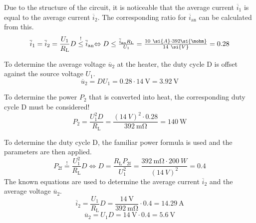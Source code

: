 \begin{solutionblock}

    Due to the structure of the circuit, it is noticeable that the average current $\overline i_1$ is equal to the average current $\overline i_2$. The corresponding ratio for $\overline i_{\mathrm{an}}$ can be calculated from this.
\begin{equation}
\overline i_1 = \overline i_2 = \frac{U_1}{ R_{\mathrm{L}}}  D \overset ! \leq {\overline i_{\mathrm{an}}}$$
 $$\Leftrightarrow D \leq \frac{ {\overline i_{\mathrm{an}}}  R_{\mathrm{L}}}{U_1} = \frac{10 \ \si{A} \cdot 392 \si{\mohm}}{14\ \si{V}} = 0.28
\end{equation}

To determine the average voltage $\overline u_2$ at the heater, the duty cycle D is offset against the source voltage $U_1$.
 \begin{equation}
 \overline u_2 = D  U_1 = 0.28 \cdot \SI{14}{\volt} = \SI{3.92}{\volt}
\end{equation}

To determine the power $P_2$ that is converted into heat, the corresponding duty cycle D must be considered!
 \begin{equation}
 P_2 = \frac{U_1^2 D}{ R_{\mathrm{L}}} = \frac{(14\ \si{V})^2 \cdot 0.28}{392\ \si{\mohm}}= \SI{140}{\watt}   
\end{equation}
\end{solutionblock}

     \begin{solutionblock}
        To determine the duty cycle D, the familiar power formula is used and the parameters are then applied.
  \begin{equation}
P_{\mathrm{2f}} \overset ! = \frac{U_1^2}{ R_{\mathrm{L}}} D
 \Leftrightarrow D = \frac{ R_{\mathrm{L}}  P_{\mathrm{2f}}}{U_1^2} = \frac{{392\ \si{\mohm}} \cdot 200 \ \si{W}}{(14\ \si{V})^2} = 0.4
\end{equation}
The known equations are used to determine the average current $\overline i_2$ and the average voltage $\overline u_2$.
 \begin{equation}
 \overline i_2 = \frac{U_1}{ R_{\mathrm{L}}} D = \frac{\SI{14}{\volt}}{392\ \si{\mohm}} \cdot 0.4 = \SI{14.29}{\ampere}
\end{equation}
\begin{equation}
 \overline u_2 = U_1 D = {\SI{14}{\volt}} \cdot 0.4 = \SI{5.6}{\volt}
\end{equation}
\end{solutionblock}

